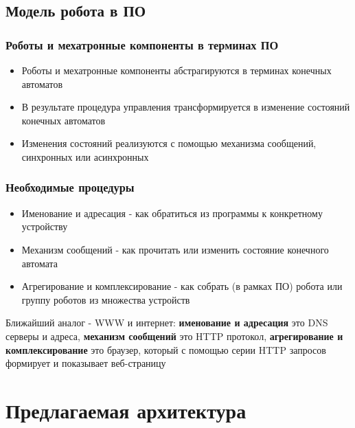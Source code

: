 \documentclass{beamer}
\begin{document}
\subsection{Модель робота в ПО}
\begin{frame}
\frametitle{Роботы и мехатронные компоненты в терминах ПО}

\begin{itemize}
\item Роботы и мехатронные компоненты абстрагируются в терминах конечных
автоматов
\item В результате процедура управления трансформируется в
изменение состояний конечных автоматов
\item Изменения состояний реализуются с помощью механизма сообщений, синхронных
или асинхронных
\end{itemize}



\end{frame}

\begin{frame}
\frametitle{Необходимые процедуры}

\begin{itemize}
\item Именование и адресация - как обратиться из программы к конкретному
устройству
\item Механизм сообщений - как прочитать или изменить состояние конечного
автомата
\item Агрегирование и комплексирование - как собрать (в рамках ПО) робота
или группу роботов из множества устройств
\end{itemize}


Ближайший аналог - WWW и интернет: \textbf{именование и адресация} это DNS
серверы и адреса, \textbf{механизм сообщений} это
HTTP протокол, \textbf{ агрегирование и комплексирование} это браузер, который
с помощью серии HTTP запросов формирует и показывает веб-страницу
\end{frame}
\section{Предлагаемая архитектура}
\end{document}
